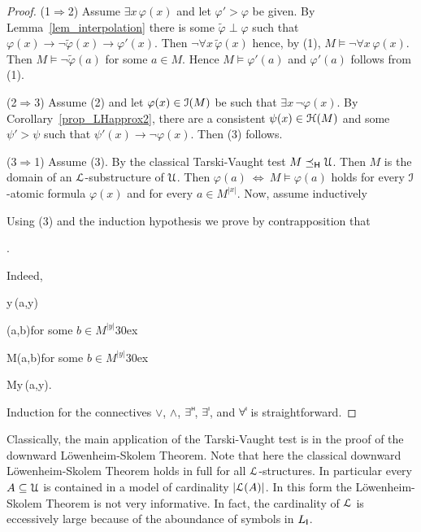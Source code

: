 \documentclass[10pt,oneside]{amsproc}
\def\forallH{\forall}
\def\existsH{\exists}
\begin{document}
\begin{proof}
  (1$\Rightarrow$2) Assume $\existsH x\,\varphi(x)$ and let $\varphi'>\varphi$ be given.
  By Lemma~\ref{lem_interpolation} there is some $\tilde{\varphi}\perp\varphi$ such that  $\varphi(x)\rightarrow\neg\tilde{\varphi}(x)\rightarrow\varphi'(x)$.
  Then $\neg\forallH x\,\tilde{\varphi}(x)$ hence, by (1), $M\models\neg\forallH x\,\varphi(x)$.
  Then $M\models\neg\tilde{\varphi}(a)$ for some $a\in M$. Hence $M\models\varphi'(a)$ and $\varphi'(a)$ follows from (1).

  (2$\Rightarrow$3)
  Assume (2) and let $\varphi(x)\in{\EuScript I}(M)$ be such that $\existsH x\,\neg\varphi(x)$.
  By Corollary~\ref{prop_LHapprox2}, there are a consistent $\psi(x)\in{\EuScript H}(M)$ and some $\psi'>\psi$ such that $\psi'(x)\rightarrow\neg\varphi(x)$.
  Then (3) follows.

  (3$\Rightarrow$1)
  Assume (3).
  By the classical Tarski-Vaught test $M\preceq_{\sf H}{\EuScript U}$.
  Then $M$ is the domain of an ${\EuScript L}$-substructure of ${\EuScript U}$.
  Then  $\varphi(a)\ \Leftrightarrow\ M\models\varphi(a)$ holds for every ${\EuScript I}$-atomic formula $\varphi(x)$ and for every $a\in M^{|x|}$.
  Now, assume inductively
  

  Using (3) and the induction hypothesis we prove by contrapposition that

  \ceq{\hfill M\models\forallH y\,\varphi(a,y)}{\Rightarrow}{\forallH y\,\varphi(a,y)}.

  Indeed,

  \ceq{\hfill\neg\forallH y\,\varphi(a,y)}
  {\Rightarrow}{\existsH y\,\neg\varphi(a,y)}
  
  \ceq{}
  {\Rightarrow}
  {\neg\varphi(a,b)}\hfill for some $b\in M^{|y|}$\kern30ex

  \ceq{}
  {\Rightarrow}
  {M\models\neg\varphi(a,b)}\hfill for some $b\in M^{|y|}$\kern30ex

  \ceq{}
  {\Rightarrow}
  {M\not\models\forallH y\,\varphi(a,y).}

  Induction for the connectives $\vee$, $\wedge$, $\exists\raisebox{1.1ex}{\scaleto{\sf H}{.8ex}\kern-.2ex}$, $\exists\raisebox{1.1ex}{\scaleto{\sf I}{.8ex}\kern-.2ex}$, and $\forall\raisebox{1.1ex}{\scaleto{\sf I}{.8ex}\kern-.2ex}$ is straightforward.
\end{proof}

Classically, the main application of the Tarski-Vaught test is in the proof of the downward L\"owenheim-Skolem Theorem.
Note that here the classical downward L\"owenheim-Skolem Theorem holds in full for all ${\EuScript L}$-structures.
In particular every $A\subseteq{\EuScript U}$ is contained in a model of cardinality $|{\EuScript L}(A)|$.
In this form the L\"owenheim-Skolem Theorem is not very informative.
In fact, the cardinality of ${\EuScript L}$ is eccessively large because of the aboundance of symbols in $L_{\sf I}$.
\end{document}
